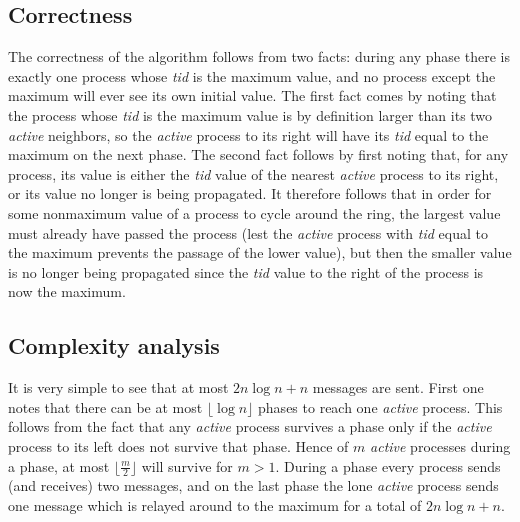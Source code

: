 \documentclass{article}
\begin{document}
\subsection*{Correctness}
The correctness of the algorithm follows from two facts: during any phase there is exactly one process whose \textit{tid} is the maximum value, and no process except the maximum will ever see its own initial value. The first fact comes by noting that the process whose \textit{tid} is the maximum value is by definition larger than its two \textit{active} neighbors, so the \textit{active} process to its right will have its \textit{tid} equal to the maximum on the next phase. The second fact follows by first noting that, for any process, its value is either the \textit{tid} value of the nearest \textit{active} process to its right, or its value no longer is being propagated. It therefore follows that in order for some nonmaximum value of a process to cycle around the ring, the largest value must already have passed the process (lest the \textit{active} process with \textit{tid} equal to the maximum prevents the passage of the lower value), but then the smaller value is no longer being propagated since the \textit{tid} value to the right of the process is now the maximum.
\subsection*{Complexity analysis}
It is very simple to see that at most $2n \log n + n$ messages are sent. First one
notes that there can be at most $\lfloor\log n\rfloor$ phases to reach one \textit{active} process. This follows from the fact that any \textit{active} process survives a phase only if the \textit{active} process to its left does not survive that phase. Hence of $m$ \textit{active} processes during a phase, at most $\lfloor\frac{m}{2}\rfloor$ will survive for $m > 1$. During a phase every process sends (and receives) two messages, and on the last phase the lone \textit{active} process sends one message which is relayed around to the maximum for a total of $2n \log n + n$.

 
\end{document}
